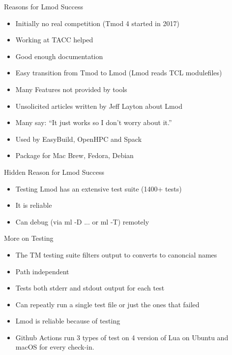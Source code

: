 \documentclass{beamer}
\begin{document}
\begin{frame}{Reasons for Lmod Success}
  \begin{itemize}
    \item Initially no real competition (Tmod 4 started in 2017)
    \item Working at TACC helped
    \item Good enough documentation
    \item Easy transition from Tmod to Lmod (Lmod reads TCL
      modulefiles)
    \item Many Features not provided by tools
    \item Unsolicited articles written by Jeff Layton about Lmod
    \item Many say: ``It just works so I don't worry about it.''
    \item Used by EasyBuild, OpenHPC and Spack
    \item Package for Mac Brew, Fedora, Debian
  \end{itemize}
\end{frame}

\begin{frame}{Hidden Reason for Lmod Success}
  \begin{itemize}
    \item Testing Lmod has an extensive test suite (1400+ tests)
    \item It is reliable
    \item Can debug (via ml -D ... or ml -T) remotely
  \end{itemize}
\end{frame}

\begin{frame}{More on Testing}
  \begin{itemize}
    \item The TM testing suite filters output to converts to canoncial
      names
    \item Path independent
    \item Tests both stderr and stdout output for each test
    \item Can repeatly run a single test file or just the ones that
      failed
    \item Lmod is reliable because of testing
    \item Github Actions run 3 types of test on 4 version of Lua on
      Ubuntu and macOS for every check-in.
  \end{itemize}
\end{frame}
\end{document}
